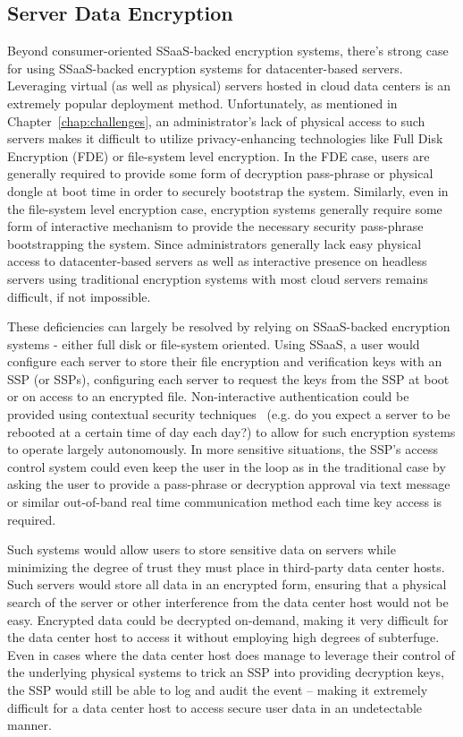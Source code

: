 \subsection{Server Data Encryption}

Beyond consumer-oriented SSaaS-backed encryption systems, there's
strong case for using SSaaS-backed encryption systems for
datacenter-based servers. Leveraging virtual (as well as physical)
servers hosted in cloud data centers is an extremely popular
deployment method. Unfortunately, as mentioned in
Chapter~\ref{chap:challenges}, an administrator's lack of physical
access to such servers makes it difficult to utilize privacy-enhancing
technologies like Full Disk Encryption (FDE) or file-system level
encryption. In the FDE case, users are generally required to provide
some form of decryption pass-phrase or physical dongle at boot time in
order to securely bootstrap the system. Similarly, even in the
file-system level encryption case, encryption systems generally
require some form of interactive mechanism to provide the necessary
security pass-phrase bootstrapping the system. Since administrators
generally lack easy physical access to datacenter-based servers as
well as interactive presence on headless servers using traditional
encryption systems with most cloud servers remains difficult, if not
impossible.

These deficiencies can largely be resolved by relying on SSaaS-backed
encryption systems - either full disk or file-system oriented. Using
SSaaS, a user would configure each server to store their file
encryption and verification keys with an SSP (or SSPs), configuring
each server to request the keys from the SSP at boot or on access to
an encrypted file. Non-interactive authentication could be provided
using contextual security techniques~\cite{hulsebosch2005} (e.g. do
you expect a server to be rebooted at a certain time of day each day?)
to allow for such encryption systems to operate largely
autonomously. In more sensitive situations, the SSP's access control
system could even keep the user in the loop as in the traditional case
by asking the user to provide a pass-phrase or decryption approval via
text message or similar out-of-band real time communication method
each time key access is required.

Such systems would allow users to store sensitive data on servers
while minimizing the degree of trust they must place in third-party
data center hosts. Such servers would store all data in an encrypted
form, ensuring that a physical search of the server or other
interference from the data center host would not be easy. Encrypted
data could be decrypted on-demand, making it very difficult for the
data center host to access it without employing high degrees of
subterfuge. Even in cases where the data center host does manage to
leverage their control of the underlying physical systems to trick an
SSP into providing decryption keys, the SSP would still be able to log
and audit the event -- making it extremely difficult for a data center
host to access secure user data in an undetectable manner.

